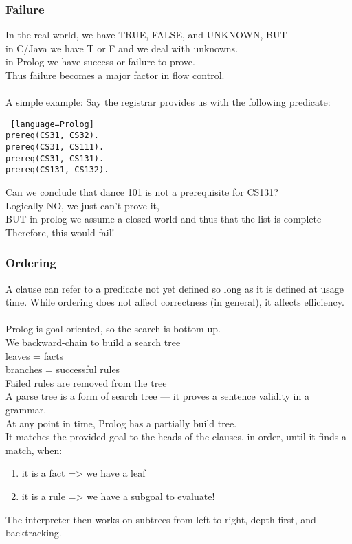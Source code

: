 \documentclass[../../lecture_notes.tex]{subfiles}
\begin{document}
\subsubsection*{Failure}
\noindent In the real world, we have TRUE, FALSE, and UNKNOWN, BUT\\
	\indent in C/Java we have T or F and we deal with unknowns.\\
	\indent in Prolog we have success or failure to prove.\\
Thus failure becomes a major factor in flow control.\\
\\
A simple example:
\indent Say the registrar provides us with the following predicate:
\begin{lstlisting} [language=Prolog]
prereq(CS31, CS32).
prereq(CS31, CS111).
prereq(CS31, CS131).
prereq(CS131, CS132).
\end{lstlisting}
Can we conclude that dance 101 is not a prerequisite for CS131?\\
	\indent Logically NO, we just can’t prove it,\\
	\indent BUT in prolog we assume a closed world and thus that the list is complete\\
	\indent Therefore, this would fail!

\subsubsection*{Ordering}
\noindent A clause can refer to a predicate not yet defined so long as it is defined at usage time.
While ordering does not affect correctness (in general), it affects efficiency.\\
\\
Prolog is goal oriented, so the search is bottom up.\\
We backward-chain to build a search tree\\
	\indent leaves = facts\\
	\indent branches = successful rules\\
Failed rules are removed from the tree\\
A parse tree is a form of search tree — it proves a sentence validity in a grammar.\\

At any point in time, Prolog has a partially build tree.\\
It matches the provided goal to the heads of the clauses, in order, until it finds a match, when:
\begin{enumerate} [itemsep=0mm]
	\item it is a fact => we have a leaf
	\item it is a rule => we have a subgoal to evaluate!
\end{enumerate}
The interpreter then works on subtrees from left to right, depth-first, and backtracking.\\
\end{document}

